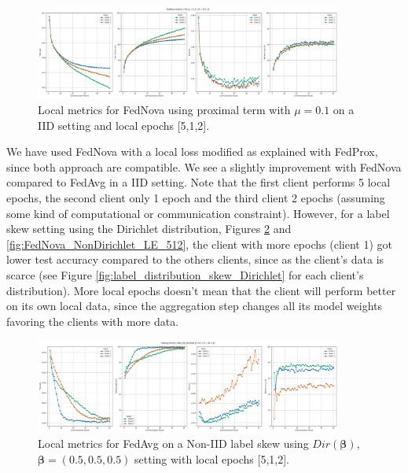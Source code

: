 \begin{figure}[H]
  \centering
  \includegraphics[width=0.9\textwidth]{figures/2-Federated_Learning/FedNova_IID_LE_512.png}
  \caption{Local metrics for FedNova using proximal term with $\mu=0.1$ on a IID setting and local epochs [5,1,2].}
  \label{fig:FedNova_IID_LE_512}
\end{figure}

We have used FedNova with a local loss modified as explained with FedProx, since both approach are compatible. We see a slightly improvement with FedNova compared to FedAvg in a IID setting. Note that the first client performs 5 local epochs, the second client only 1 epoch and the third client 2 epochs (assuming some kind of computational or communication constraint). However, for a label skew setting using the Dirichlet distribution, Figures \ref{fig:FedAvg_NonDirichlet_LE_512} and \ref{fig:FedNova_NonDirichlet_LE_512}, the client with more epochs (client 1) got lower test accuracy compared to the others clients, since as the client's data is scarce (see Figure \ref{fig:label_distribution_skew_Dirichlet} for each client's distribution). More local epochs doesn't mean that the client will perform better on its own local data, since the aggregation step changes all its model weights favoring the clients with more data.


\begin{figure}[H]
  \centering
  \includegraphics[width=0.9\textwidth]{figures/2-Federated_Learning/FedAvg_NonDirichlet_LE_512.png}
  \caption{Local metrics for FedAvg on a Non-IID label skew using $Dir(\boldsymbol{\beta})$, $\boldsymbol{\beta}=(0.5, 0.5, 0.5)$ setting with local epochs [5,1,2].}
  \label{fig:FedAvg_NonDirichlet_LE_512}
\end{figure}


